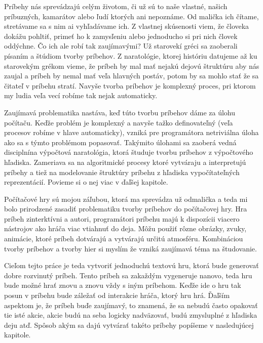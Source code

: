 Príbehy nás sprevádzajú celým životom, či už sú to naše vlastné, našich príbuzných, kamarátov alebo ľudí ktorých ani nepoznáme. Od malička ich čítame, stretávame sa s nim ai vyhľadávame ich. Z vlastnej skúsenosti viem, že človeka dokážu pohltiť, primeť ho k zamysľeniu alebo jednoducho si pri nich človek oddýchne. Čo ich ale robí tak zaujímavými? Už starovekí gréci sa zaoberali písaním a štúdiom tvorby príbehov. Z naratológie, ktorej históriu datujeme až ku starovekým grékom vieme, že príbeh by mal mať nejakú dejovú štruktúru aby nás zaujal a príbeh by nemal mať veľa hlavných postáv, potom by sa mohlo stať že sa čitateľ v príbehu stratí. Navyše tvorba príbehov je komplexný proces, pri ktorom my ludia veľa vecí robíme tak nejak automaticky.\par
Zaujímavá problematika nastáva, keď túto tvorbu príbehov dáme za úlohu počítaču. Keďže problém je komplexný a navyše tažko definovateľný (veľa procesov robíme v hlave automaticky), vzniká pre programátora netriviálna úloha ako sa s týmto problémom popasovať. Takýmito úlohami sa zaoberá vedná disciplnína výpočtová naratológia, ktorá študuje tvorbu príbehov z výpočtového hľadiska. Zameriava sa na algoritmické procesy ktoré vytváraju a interpretujú príbehy a tiež na modelovanie štruktúry príbehu z hľadiska vypočítateľných reprezentácií. Povieme si o nej viac v ďaľšej kapitole.\par
Počítačové hry sú mojou záľubou, ktorá ma sprevádza už odmalička a teda mi bolo prirodzené zasadiť problematiku tvorby príbehov do počítačovej hry. Hra príbeh zinterktívni a autori, programátori príbehu majú k dispozícii viacero nástrojov ako hráča viac vtiahnuť do deja. Môžu použiť rôzne obrázky, zvuky, animácie, ktoré príbeh dotvárajú a vytvárajú určitú atmosféru. Kombináciou tvorby príbehov a tvorby hier si myslím že vzniká zaujímavá téma na študovanie.\par
Cieľom tejto práce je teda vytvoriť jednoduchú textovú hru, ktorá bude generovať dobre rozvinutý príbeh. Tento príbeh sa zakaždým vygeneruje nanovo, teda hru bude možné hrať znovu a znovu vždy s iným príbehom. Keďže ide o hru tak posun v príbehu bude záležať od interakcie hráča, ktorý hru hrá. Ďaľším aspektom je, že príbeh buďe zaujímavý, to znamená, že sa nebudú často opakovať tie isté akcie, akcie budú na seba logicky nadväzovať, budú zmysluplné z hľadiska deju atď. Spôsob akým sa dajú vytvárať takéto príbehy popíšeme v nasledujúcej kapitole.


